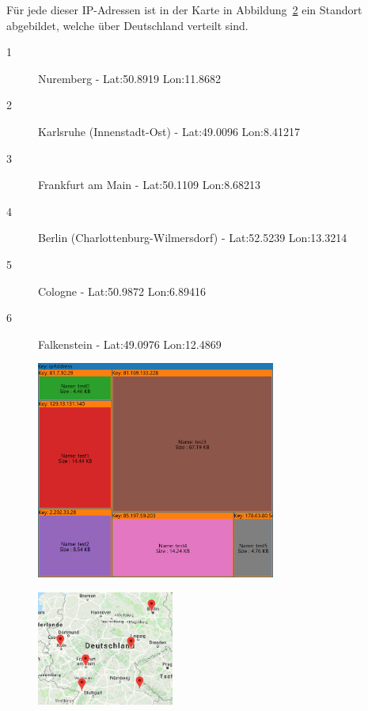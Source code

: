 \documentclass[
    fontsize=12pt,
    headings=small,
    parskip=half,           %
    bibliography=totoc,
    numbers=noenddot,       %
    open=any,               %
    ]{scrreprt}
\begin{document}
Für jede dieser IP-Adressen ist in der Karte in Abbildung~\ref{fig:TIpM} ein Standort abgebildet, welche über Deutschland verteilt sind. 
\begin{description}
\item[1] Nuremberg - Lat:50.8919 Lon:11.8682
\item[2] Karlsruhe (Innenstadt-Ost) - Lat:49.0096 Lon:8.41217
\item[3] Frankfurt am Main - Lat:50.1109 Lon:8.68213
\item[4] Berlin (Charlottenburg-Wilmersdorf) - Lat:52.5239 Lon:13.3214
\item[5] Cologne - Lat:50.9872 Lon:6.89416
\item[6] Falkenstein - Lat:49.0976 Lon:12.4869
\end{description}

\begin{figure}[H]
\includegraphics[width=0.7\textwidth]{../pic/IP-Tor-SetB-tree2.PNG}
\label{fig:TIpTM}
\end{figure}

\begin{figure}[H]
\includegraphics[width=0.4\textwidth]{../pic/IP-Tor-SetB.PNG}
\label{fig:TIpM}
\end{figure}
\end{document}
